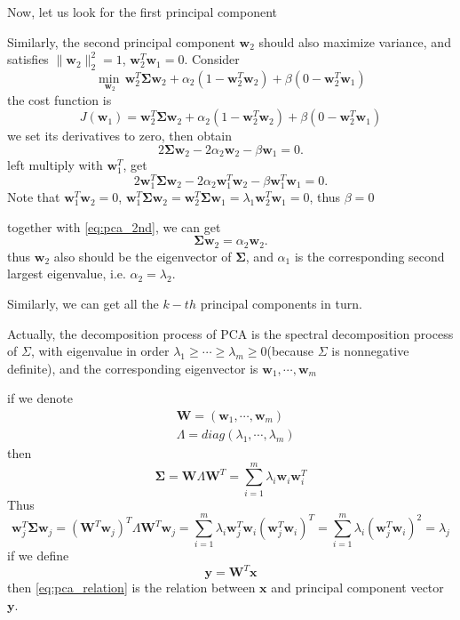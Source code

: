 Now, let us look for the first principal component

\noindent Similarly, the second principal component $\mathbf{w}_2$  should also maximize variance, and satisfies $\|\mathbf{w}_2\|_2^2 = 1$, $\mathbf{w}_2^T\mathbf{w}_1 = 0$. Consider
\[
	\underset{\mathbf{w}_2}{\min\,} \mathbf{w}_2^T \mathbf{\Sigma} \mathbf{w}_2 + \alpha_2(1-\mathbf{w}_2^T\mathbf{w}_2) + \beta(0-\mathbf{w}_2^T\mathbf{w}_1)
\]
the cost function is 
\[
	J(\mathbf{w}_1) = \mathbf{w}_2^T \mathbf{\Sigma} \mathbf{w}_2 + \alpha_2(1-\mathbf{w}_2^T\mathbf{w}_2) + \beta(0-\mathbf{w}_2^T\mathbf{w}_1)
\]
we set its derivatives to zero, then obtain 
\begin{equation}
	\label{eq:pca_2nd}
	2\mathbf{\Sigma} \mathbf{w}_2 - 2\alpha_2\mathbf{w}_2 - \beta\mathbf{w}_1 = 0.
\end{equation}
left multiply with $\mathbf{w}_1^T$, get
\[
	2\mathbf{w}_1^T\mathbf{\Sigma} \mathbf{w}_2 - 2\alpha_2\mathbf{w}_1^T\mathbf{w}_2 - \beta\mathbf{w}_1^T\mathbf{w}_1 = 0.
\]
Note that $\mathbf{w}_1^T\mathbf{w}_2=0$, $\mathbf{w}_1^T\mathbf{\Sigma} \mathbf{w}_2 = \mathbf{w}_2^T\mathbf{\Sigma} \mathbf{w}_1 = \lambda_1\mathbf{w}_2^T\mathbf{w}_1 = 0$, thus $\beta = 0$

together with \ref{eq:pca_2nd}, we can get
\[
	\mathbf{\Sigma} \mathbf{w}_2 = \alpha_2\mathbf{w}_2.
\]
thus $\mathbf{w}_2$ also should be the eigenvector of $\mathbf{\Sigma}$, and $\alpha_1$ is the corresponding second largest eigenvalue, i.e. $\alpha_2 = \lambda_2$.

Similarly, we can get all the $k-th$ principal components in turn.

Actually, the decomposition process of PCA is the spectral decomposition process of $\Sigma$, with eigenvalue in order $\lambda_1 \geq \cdots \geq \lambda_m \geq 0$(because $\Sigma$ is nonnegative definite), and the corresponding eigenvector is $\mathbf{w}_1,\cdots,\mathbf{w}_m$

if we denote 
\begin{align*}
	& \mathbf{W} = (\mathbf{w}_1,\cdots,\mathbf{w}_m)\\
	& \Lambda = diag(\lambda_1,\cdots,\lambda_m)
\end{align*}
then
\[
	\mathbf{\Sigma} = \mathbf{W}\Lambda\mathbf{W}^T = \sum_{i=1}^{m}\lambda_i \mathbf{w}_i\mathbf{w}_i^T
\]
Thus
\[
	\mathbf{w}_j^T\mathbf{\Sigma}\mathbf{w}_j =
	 (\mathbf{W}^T\mathbf{w}_j)^T\Lambda \mathbf{W}^T\mathbf{w}_j =
	 \sum_{i=1}^{m}\lambda_i \mathbf{w}_j^T\mathbf{w}_i(\mathbf{w}_j^T\mathbf{w}_i)^T= \sum_{i=1}^{m}\lambda_i (\mathbf{w}_j^T\mathbf{w}_i)^2=\lambda_j
\]
if we define 
\begin{equation}
	\label{eq:pca_relation}
	\mathbf{y} = \mathbf{W}^T \mathbf{x}
\end{equation}
then \ref{eq:pca_relation} is the relation between $\mathbf{x}$ and principal component vector $\mathbf{y}$.

